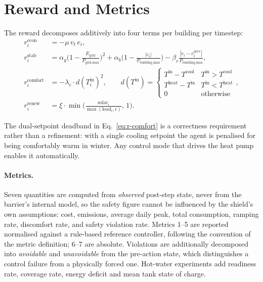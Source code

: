 \documentclass[11pt]{article}
\begin{document}
\section{Reward and Metrics}
\label{sec:reward}

The reward decomposes additively into four terms per building per timestep:
\begin{align}
r^{\text{econ}}_i &= -\mu\, v_t\, e_i, \label{eq:r-econ}\\
r^{\text{stab}}_i &= \alpha_g\Big(1 - \tfrac{E_{\text{grid}}}{P_{\text{grid,max}}}\Big)^2
+ \alpha_b\Big(1 - \tfrac{|e_i|}{P_{\text{building,max}}}\Big)
- \beta_r \tfrac{|e_i - e_i^{\text{prev}}|}{P_{\text{building,max}}}, \label{eq:r-stab}\\
r^{\text{comfort}}_i &= -\lambda_c \cdot d(T^{\text{in}}_i)^2, \qquad
d(T^{\text{in}}) = \begin{cases}
T^{\text{in}} - T^{\text{cool}} & T^{\text{in}} > T^{\text{cool}} \\
T^{\text{heat}} - T^{\text{in}} & T^{\text{in}} < T^{\text{heat}} \\
0 & \text{otherwise}
\end{cases}, \label{eq:r-comfort}\\
r^{\text{renew}}_i &= \xi \cdot \min\!\Big(\tfrac{\text{solar}_i}{\max(\text{load}_i,\epsilon)},\, 1\Big). \label{eq:r-renew}
\end{align}

The dual-setpoint deadband in Eq.~\ref{eq:r-comfort} is a correctness
requirement rather than a refinement: with a single cooling setpoint the agent is
penalised for being comfortably warm in winter. Any control mode that drives the
heat pump enables it automatically.

\paragraph{Metrics.} Seven quantities are computed from \emph{observed} post-step
state, never from the barrier's internal model, so the safety figure cannot be
influenced by the shield's own assumptions: cost, emissions, average daily peak,
total consumption, ramping rate, discomfort rate, and safety violation rate.
Metrics 1--5 are reported normalised against a rule-based reference controller,
following the convention of the metric definition; 6--7 are absolute. Violations
are additionally decomposed into \emph{avoidable} and \emph{unavoidable} from the
pre-action state, which distinguishes a control failure from a physically forced
one. Hot-water experiments add readiness rate, coverage rate, energy deficit and
mean tank state of charge.
\end{document}
